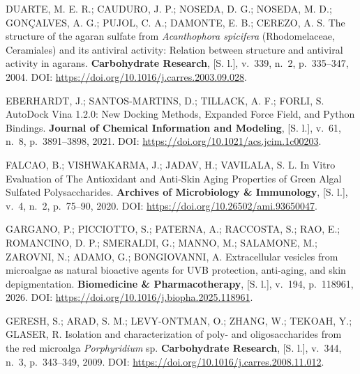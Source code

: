 \begin{samepage}
\filbreak\hypertarget{cite.0@duarte2004}{}DUARTE, M. E. R.; CAUDURO, J. P.; NOSEDA, D. G.; NOSEDA, M. D.; GONÇALVES, A. G.; PUJOL, C. A.; DAMONTE, E. B.; CEREZO, A. S. The structure of the agaran sulfate from \textit{Acanthophora spicifera} (Rhodomelaceae, Ceramiales) and its antiviral activity: Relation between structure and antiviral activity in agarans. \textbf{Carbohydrate Research}, [S. l.], v.~339, n.~2, p.~335--347, 2004. DOI: \url{https://doi.org/10.1016/j.carres.2003.09.028}.
\end{samepage}

\begin{samepage}
\filbreak\hypertarget{cite.0@eberhardt2021vina}{}EBERHARDT, J.; SANTOS-MARTINS, D.; TILLACK, A. F.; FORLI, S. AutoDock Vina 1.2.0: New Docking Methods, Expanded Force Field, and Python Bindings. \textbf{Journal of Chemical Information and Modeling}, [S. l.], v.~61, n.~8, p.~3891--3898, 2021. DOI: \url{https://doi.org/10.1021/acs.jcim.1c00203}.
\end{samepage}

\begin{samepage}
\filbreak\hypertarget{cite.0@falcao2020}{}FALCAO, B.; VISHWAKARMA, J.; JADAV, H.; VAVILALA, S. L. In Vitro Evaluation of The Antioxidant and Anti-Skin Aging Properties of Green Algal Sulfated Polysaccharides. \textbf{Archives of Microbiology \& Immunology}, [S. l.], v.~4, n.~2, p.~75--90, 2020. DOI: \url{https://doi.org/10.26502/ami.93650047}.
\end{samepage}

\begin{samepage}
\filbreak\hypertarget{cite.0@gargano2026}{}GARGANO, P.; PICCIOTTO, S.; PATERNA, A.; RACCOSTA, S.; RAO, E.; ROMANCINO, D. P.; SMERALDI, G.; MANNO, M.; SALAMONE, M.; ZAROVNI, N.; ADAMO, G.; BONGIOVANNI, A. Extracellular vesicles from microalgae as natural bioactive agents for UVB protection, anti-aging, and skin depigmentation. \textbf{Biomedicine \& Pharmacotherapy}, [S. l.], v.~194, p.~118961, 2026. DOI: \url{https://doi.org/10.1016/j.biopha.2025.118961}.
\end{samepage}

\begin{samepage}
\filbreak\hypertarget{cite.0@geresh2009}{}GERESH, S.; ARAD, S. M.; LEVY-ONTMAN, O.; ZHANG, W.; TEKOAH, Y.; GLASER, R. Isolation and characterization of poly- and oligosaccharides from the red microalga \textit{Porphyridium} sp. \textbf{Carbohydrate Research}, [S. l.], v.~344, n.~3, p.~343--349, 2009. DOI: \url{https://doi.org/10.1016/j.carres.2008.11.012}.
\end{samepage}

